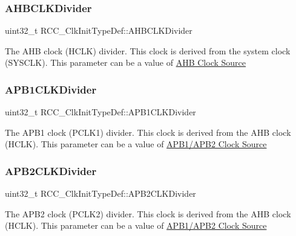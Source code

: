 \subsubsection{\texorpdfstring{A\+H\+B\+C\+L\+K\+Divider}{AHBCLKDivider}}
{\footnotesize\ttfamily uint32\+\_\+t R\+C\+C\+\_\+\+Clk\+Init\+Type\+Def\+::\+A\+H\+B\+C\+L\+K\+Divider}

The A\+HB clock (H\+C\+LK) divider. This clock is derived from the system clock (S\+Y\+S\+C\+LK). This parameter can be a value of \hyperlink{group___r_c_c___a_h_b___clock___source}{A\+HB Clock Source} \mbox{\label{struct_r_c_c___clk_init_type_def_a21ceb024102adc3c4dc7eb270cf02ebd}} 
\subsubsection{\texorpdfstring{A\+P\+B1\+C\+L\+K\+Divider}{APB1CLKDivider}}
{\footnotesize\ttfamily uint32\+\_\+t R\+C\+C\+\_\+\+Clk\+Init\+Type\+Def\+::\+A\+P\+B1\+C\+L\+K\+Divider}

The A\+P\+B1 clock (P\+C\+L\+K1) divider. This clock is derived from the A\+HB clock (H\+C\+LK). This parameter can be a value of \hyperlink{group___r_c_c___a_p_b1___a_p_b2___clock___source}{A\+P\+B1/\+A\+P\+B2 Clock Source} \mbox{\label{struct_r_c_c___clk_init_type_def_aa75c110cd93855d49249f38da8cf94f7}} 
\subsubsection{\texorpdfstring{A\+P\+B2\+C\+L\+K\+Divider}{APB2CLKDivider}}
{\footnotesize\ttfamily uint32\+\_\+t R\+C\+C\+\_\+\+Clk\+Init\+Type\+Def\+::\+A\+P\+B2\+C\+L\+K\+Divider}

The A\+P\+B2 clock (P\+C\+L\+K2) divider. This clock is derived from the A\+HB clock (H\+C\+LK). This parameter can be a value of \hyperlink{group___r_c_c___a_p_b1___a_p_b2___clock___source}{A\+P\+B1/\+A\+P\+B2 Clock Source} \mbox{\label{struct_r_c_c___clk_init_type_def_a93a53676a1cfc5b55b8b990e7ff4dac5}} 
